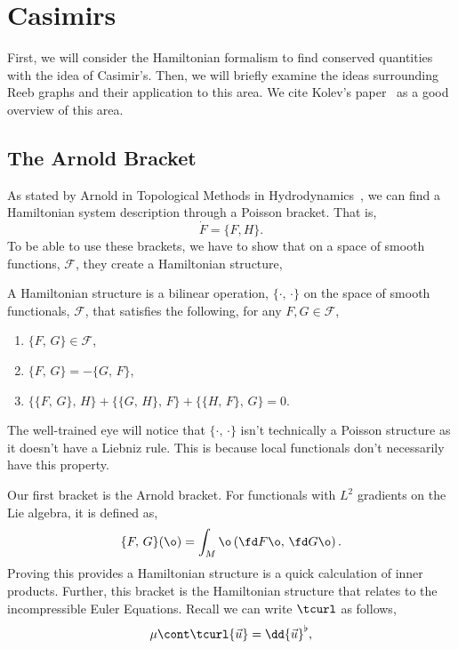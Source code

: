 
\section{Casimirs}
First, we will consider the Hamiltonian formalism to find conserved quantities with the idea of Casimir's. Then, we will briefly examine the ideas surrounding Reeb graphs and their application to this area. We cite Kolev's paper~\cite{Kolev_2007} as a good overview of this area.

\subsection{The Arnold Bracket}
As stated by Arnold in Topological Methods in Hydrodynamics~\cite{tmih}, we can find a Hamiltonian system description through a Poisson bracket. That is,
$$ \dot F = \{F, H\}. $$
\noindent
To be able to use these brackets, we have to show that on a space of smooth functions, $\mathcal{F}$, they create a Hamiltonian structure,
\begin{ndefi}
  A Hamiltonian structure is a bilinear operation, $\{\cdot,\,\cdot\}$ on the space of smooth functionals, $\mathcal{F}$, that satisfies the following, for any $F,G \in \mathcal{F}$,
  \begin{enumerate}
    \item $\{F,\, G\} \in \mathcal{F}$,
    \item $\{F,\, G\} = -\{G,\, F\}$,
    \item $\{\{F,\, G\},\, H\} + \{\{G ,\, H\},\, F\} + \{\{H,\, F\},\, G\} = 0$.
  \end{enumerate}
\end{ndefi}
\begin{remark}
   The well-trained eye will notice that $\{\cdot,\,\cdot\}$ isn't technically a Poisson structure as it doesn't have a Liebniz rule. This is because local functionals don't necessarily have this property.
\end{remark}
\noindent
Our first bracket is the Arnold bracket. For functionals with $L^2$ gradients on the Lie algebra, it is defined as,
$$ \{F,\, G\}(\o) = \int_M \o\left( \fd F \o,\, \fd G \o \right). $$
\noindent
Proving this provides a Hamiltonian structure is a quick calculation of inner products. Further, this bracket is the Hamiltonian structure that relates to the incompressible Euler Equations. Recall we can write $\tcurl$ as follows,
$$ \mu \cont \tcurl {\vec u} = \dd {\vec u}^\flat, $$
